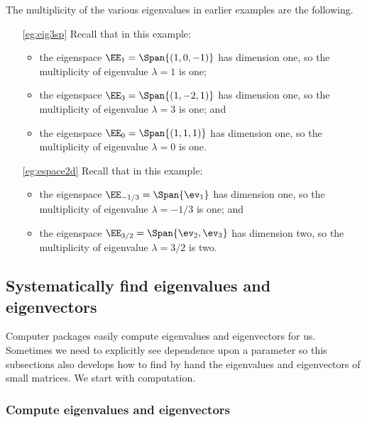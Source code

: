 \begin{example} \label{eg:}
The multiplicity of the various eigenvalues in earlier examples are the following.
\begin{itemize}
\item[\ref{eg:eig3sp}] Recall that in this example:
\begin{itemize}
\item the eigenspace \(\EE_1=\Span\{(1,0,-1)\}\) has dimension one, so the multiplicity of eigenvalue \(\lambda=1\) is one;
\item the eigenspace \(\EE_3=\Span\{(1,-2,1)\}\) has dimension one, so the multiplicity of eigenvalue \(\lambda=3\) is one; and
\item the eigenspace \(\EE_0=\Span\{(1,1,1)\}\) has dimension one, so the multiplicity of eigenvalue \(\lambda=0\) is one.
\end{itemize}

\item[\ref{eg:espace2d}] Recall that in this example: 
\begin{itemize}
\item the eigenspace \(\EE_{-1/3}=\Span\{\ev_1\}\) has dimension one, so the multiplicity of eigenvalue \(\lambda=-1/3\) is one; and
\item the eigenspace \(\EE_{3/2}=\Span\{\ev_2,\ev_3\}\) has dimension two, so the multiplicity of eigenvalue \(\lambda=3/2\) is two.
\end{itemize}

\end{itemize}
\end{example}














\subsection{Systematically find eigenvalues and eigenvectors}

Computer packages easily compute eigenvalues and eigenvectors for us.
Sometimes we need to explicitly see dependence upon a parameter so this subsections also develops how to find by hand the eigenvalues and eigenvectors of small matrices.
We start with computation.


\subsubsection{Compute eigenvalues and eigenvectors}
\label{sec:cee}

